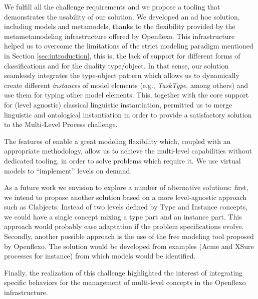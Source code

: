 

We fulfill all the challenge requirements and we propose a tooling that
demonstrates the usability of our solution. We developed an ad hoc solution,
including models and metamodels, thanks to the flexibility provided by the
metametamodeling infrastructure offered by Openflexo. This infrastructure helped us to overcome the limitations of the strict modeling paradigm mentioned in Section \ref{sec:introduction}, this is, the lack of support for different forms of classifications and for the duality type/object. In that sense, our solution seamlessly integrates the type-object pattern which allows us to dynamically create different \emph{instances} of model elements (e.g., \emph{TaskType}, among others) and use them for typing other model elements. This, together with the \FML core support for (level agnostic) classical linguistic instantiation, permitted us to merge linguistic and ontological instantiation in order to provide a satisfactory solution to the Multi-Level Process challenge.

The features of \FML enable a great modeling flexibility which, coupled with an appropriate methodology, allow us to achieve 
the multi-level capabilities without dedicated tooling, in order to solve
problems which require it. We use virtual models to \enquote{implement} levels on demand.


As a future work we envision to explore a number of alternative solutions:
first, we intend to propose another solution based on a more level-agnostic
approach such as Clabjects. Instead of two levels defined by Type and Instance
concepts, we could have a single concept mixing a type part and an instance
part. This approach would probably ease adaptation if the problem
specifications evolve. Secondly, another possible approach is the use of the
free modeling tool proposed by Openflexo. The solution would be developed from
examples (Acme and XSure processes for instance) from which models would be
identified.

Finally, the realization of this challenge highlighted the interest
of integrating specific behaviors for the management of multi-level concepts in
the Openflexo infrastructure. %
